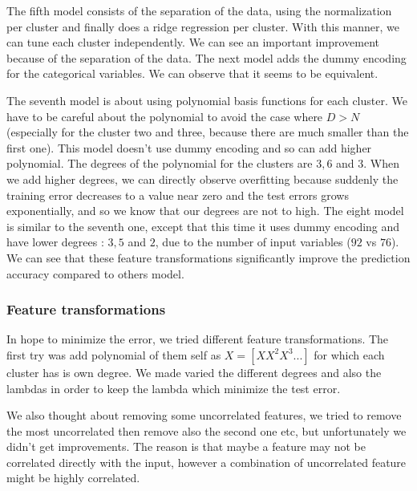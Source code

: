 \documentclass{article} %
\begin{document}
The fifth model consists of the separation of the data, using the normalization per cluster and finally does a ridge regression per cluster. With this manner, we can tune each cluster independently. We can see an important improvement because of the separation of the data. The next model adds the dummy encoding for the categorical variables. We can observe that it seems to be equivalent.

The seventh model is about using polynomial basis functions for each cluster. We have to be careful about the polynomial to avoid the case where $D > N$ (especially for the cluster two and three, because there are much smaller than the first one). This model doesn't use dummy encoding and so can add higher polynomial. The degrees of the polynomial for the clusters are $3,6$ and $3$. When we add higher degrees, we can directly observe overfitting because suddenly the training error decreases to a value near zero and the test errors grows exponentially, and so we know that our degrees are not to high. The eight model is similar to the seventh one, except that this time it uses dummy encoding and have lower degrees : $3,5$ and $2$, due to the number of input variables ($92$ vs $76$). We can see that these feature transformations significantly improve the prediction accuracy compared to others model.

\subsubsection{Feature transformations}

In hope to minimize the error, we tried different feature transformations. The first try was add polynomial of them self as $X = [X X^2 X^3 ...]$ for which each cluster has is own degree. We made varied the different degrees and also the lambdas in order to keep the lambda which minimize the test error.

We also thought about removing some uncorrelated features, we tried to remove the most uncorrelated then remove also the second one etc, but unfortunately we didn't get improvements. The reason is that maybe a feature may not be correlated directly with the input, however a combination of uncorrelated feature might be highly correlated.
\end{document}
